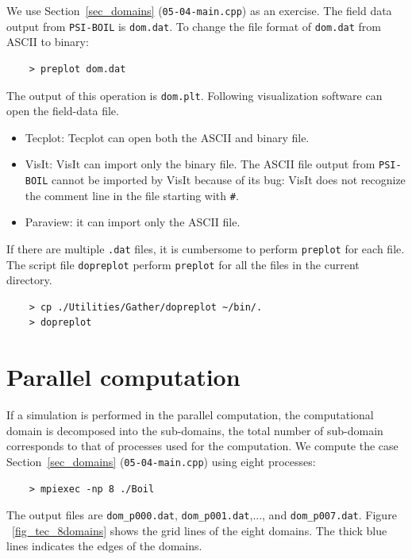 We use Section~\ref{sec_domains} ({\tt 05-04-main.cpp}) as an exercise. The field data output from {\tt PSI-BOIL} is {\tt dom.dat}. To change the file format of {\tt dom.dat} from ASCII to binary:
\begin{verbatim}
	> preplot dom.dat
\end{verbatim}
The output of this operation is {\tt dom.plt}. Following visualization software can open the field-data file. 
\begin{itemize}
	\item Tecplot: Tecplot can open both the ASCII and binary file. 
	\item VisIt: VisIt can import only the binary file. The ASCII file output from {\tt PSI-BOIL} cannot be imported by VisIt because of its bug: VisIt does not recognize the comment line in the file starting with {\tt \#}.
	\item Paraview: it can import only the ASCII file.
\end{itemize}

If there are multiple {\tt *.dat} files, it is cumbersome to perform {\tt preplot} for each file. The script file {\tt dopreplot}  perform {\tt preplot} for all the files in the current directory.
\begin{verbatim}
	> cp ./Utilities/Gather/dopreplot ~/bin/.
	> dopreplot 
\end{verbatim}

\section{Parallel computation}
If a simulation is performed in the parallel computation, the computational domain is decomposed into the sub-domains, the total number of sub-domain corresponds to that of processes used for the computation. We compute the case Section~\ref{sec_domains} ({\tt 05-04-main.cpp}) using eight processes:
\begin{verbatim}
	> mpiexec -np 8 ./Boil 
\end{verbatim}
The output files are {\tt dom\_p000.dat}, {\tt dom\_p001.dat},..., and {\tt dom\_p007.dat}. Figure ~\ref{fig_tec_8domains} shows the grid lines of the eight domains. The thick blue lines indicates the edges of the domains.  

